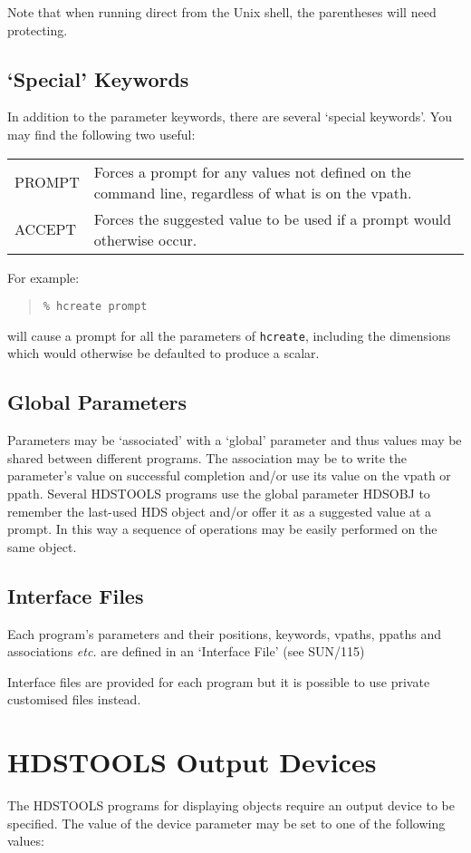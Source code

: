 \documentclass[twoside,11pt]{article}
\newcommand{\latex}[1]{#1}
\newcommand{\xref}[3]{#1}
\renewcommand{\_}{\texttt{\symbol{95}}}
\begin{document}
Note that when running direct from the Unix shell, the parentheses will need
protecting.

\subsection{`Special' Keywords}
In addition to the parameter keywords, there are several `special keywords'.
You may find the following two useful:

\begin{tabular}[t]{p{0.8in}p{5in}}
PROMPT & Forces a prompt for any values not defined on the command
line, regardless of what is on the vpath. \\
ACCEPT & Forces the suggested value to be used if a prompt would
otherwise occur.
\end{tabular}

For example:
\begin{quote}
\texttt{\% hcreate prompt}
\end{quote}
will cause a prompt for all the parameters of \texttt{hcreate}, including
the dimensions which would otherwise be defaulted to produce a scalar.

\subsection{Global Parameters}
Parameters may be `associated' with a `global' parameter and thus values
may be shared between different programs. The association may be to write the
parameter's value on successful completion and/or use its value on the vpath
or ppath. Several HDSTOOLS programs use the global parameter HDSOBJ to
remember the last-used HDS object and/or offer it as a suggested value at a
prompt. In this way a sequence of operations may be easily performed on the
same object.

\subsection{Interface Files}
Each program's parameters and their positions, keywords, vpaths, ppaths and
associations \textit{etc.} are defined in an
\xref{`Interface File'}{sun115}{}\latex{ (see SUN/115)}

Interface files are provided for each program but it is possible to use
private customised files instead.

\section{\label{hdstools_output_devices}HDSTOOLS Output Devices}
The HDSTOOLS programs for displaying objects require an output device to be
specified.
The value of the device parameter may be set to one of the following values:
\end{document}
